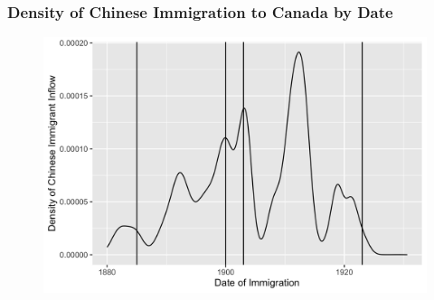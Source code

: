 \documentclass[pdf]{beamer}
\begin{document}
\begin{frame}[label = dateimmchi]
	\frametitle{Density of Chinese Immigration to Canada by Date}
    \centering
	\begin{figure}[H]
		\begin{center}
			\includegraphics[width=\textwidth]{../../figs/dateimmchi.png}
		\end{center}
	\end{figure}
    \hyperlink{yrimmchi}{}
\end{frame}

\end{document}
